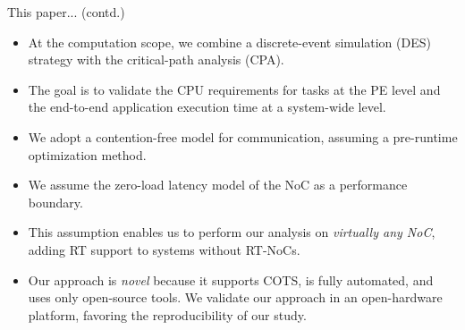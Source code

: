\begin{frame}{This paper... (contd.)}
		
	\begin{itemize}
	
		\item At the computation scope, we combine a discrete-event simulation (DES) strategy with the critical-path analysis (CPA). 
		
		\item The goal is to validate the CPU requirements for tasks at the PE level and the end-to-end application execution time at a system-wide level. 
		
		\item We adopt a contention-free model for communication, assuming a pre-runtime optimization method. 
		
		\item We assume the zero-load latency model of the NoC as a performance boundary. 
		
		\item This assumption enables us to perform our analysis on \emph{virtually any NoC}, adding RT support to systems without RT-NoCs. 
		
		\item Our approach is \emph{novel} because it supports COTS, is fully automated, and uses only open-source tools. We validate our approach in an open-hardware platform, favoring the reproducibility of our study.%

	\end{itemize}	
\end{frame}